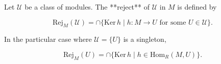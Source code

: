 Let $\mathcal{U}$ be a class of modules. The **reject** of $\mathcal{U}$ in $M$ is defined by

$$\mathrm{Rej}_M(\mathcal{U}) = \cap \{ \mathrm{Ker}\, h \mid h: M \rightarrow U \text{ for some } U \in \mathcal{U} \}.$$

In the particular case where $\mathcal{U} = \{U\}$ is a singleton,

$$\mathrm{Rej}_M(U) = \cap \{ \mathrm{Ker}\, h \mid h \in \mathrm{Hom}_R(M, U) \}.$$
